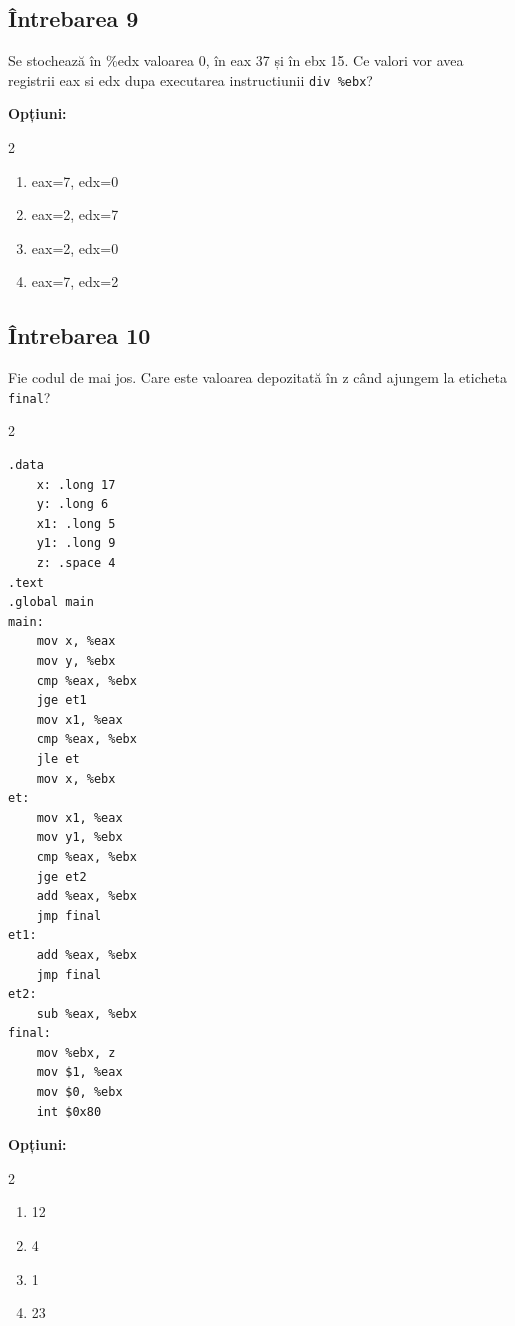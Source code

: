\documentclass[12pt,a4paper]{article}
\begin{document}
\subsection*{Întrebarea 9}
Se stochează în \%edx valoarea 0, în eax 37 și în ebx 15. Ce valori vor avea registrii eax si edx dupa executarea instructiunii \texttt{div \%ebx}?

\textbf{Opțiuni:}
\begin{multicols}{2}
\begin{enumerate}[label=\alph*)]
    \item eax=7, edx=0
    \item eax=2, edx=7
    \item eax=2, edx=0
    \item eax=7, edx=2
\end{enumerate}
\end{multicols}

\subsection*{Întrebarea 10}
Fie codul de mai jos. Care este valoarea depozitată în z când ajungem la eticheta \texttt{final}?

\begin{multicols}{2}
\begin{lstlisting}[language=x86asm]
.data
    x: .long 17
    y: .long 6
    x1: .long 5
    y1: .long 9
    z: .space 4
.text
.global main
main:
    mov x, %eax
    mov y, %ebx
    cmp %eax, %ebx
    jge et1
    mov x1, %eax
    cmp %eax, %ebx
    jle et
    mov x, %ebx
et:
    mov x1, %eax
    mov y1, %ebx
    cmp %eax, %ebx
    jge et2
    add %eax, %ebx
    jmp final
et1:
    add %eax, %ebx
    jmp final
et2:
    sub %eax, %ebx
final:
    mov %ebx, z
    mov $1, %eax
    mov $0, %ebx
    int $0x80
\end{lstlisting}
\end{multicols}

\textbf{Opțiuni:}
\begin{multicols}{2}
\begin{enumerate}[label=\alph*)]
    \item 12
    \item 4 
    \item 1
    \item 23
\end{enumerate}
\end{multicols}
\newpage
\end{document}
